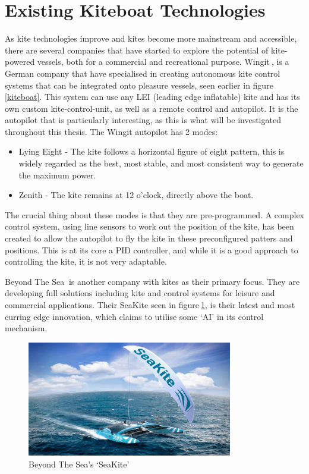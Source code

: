 \section{Existing Kiteboat Technologies}\label{sec:kiteboat_tech}
As kite technologies improve and kites become more mainstream and accessible, there are several companies that have started to explore the potential of kite-powered vessels, both for a commercial and recreational purpose. Wingit$~$\cite{wingit}, is a German company that have specialised in creating autonomous kite control systems that can be integrated onto pleasure vessels, seen earlier in figure$~$\ref{kiteboat}. This system can use any LEI (leading edge inflatable) kite and has its own custom kite-control-unit, as well as a remote control and autopilot. It is the autopilot that is particularly interesting, as this is what will be investigated throughout this thesis. The Wingit autopilot has 2 modes:
\begin{itemize}
    \item Lying Eight - The kite follows a horizontal figure of eight pattern, this is widely regarded as the best, most stable, and most consistent way to generate the maximum power.
    \item Zenith - The kite remains at 12 o'clock, directly above the boat.
\end{itemize}
The crucial thing about these modes is that they are pre-programmed. A complex control system, using line sensors to work out the position of the kite, has been created to allow the autopilot to fly the kite in these preconfigured patters and positions. This is at its core a PID controller, and while it is a good approach to controlling the kite, it is not very adaptable. 

Beyond The Sea$~$\cite{beyondthesea} is another company with kites as their primary focus. They are developing full solutions including kite and control systems for leisure and commercial applications. Their SeaKite seen in figure$~$\ref{seakite}, is their latest and most curring edge innovation, which claims to utilise some `AI' in its control mechanism. 

\begin{figure}
\centering
    \includegraphics[width=0.8\textwidth]{Images/seakite.jpg}
    \caption{Beyond The Sea's `SeaKite'}\label{seakite}
\end{figure}

